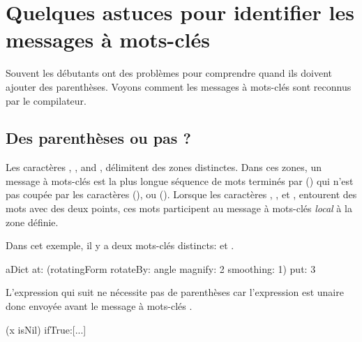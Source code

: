 \documentclass[a4paper,10pt,twoside]{book}
\begin{document}
\section{Quelques astuces pour identifier les messages à mots-clés}
Souvent les débutants ont des problèmes pour comprendre quand ils doivent ajouter des parenthèses. Voyons comment les messages à mots-clés sont reconnus par le compilateur.

\subsection{Des parenthèses ou pas ?}
Les caractères \ct{[}, \ct{]}, and \ct{(}, \ct{)} 
délimitent des zones distinctes. Dans ces zones, un message à mots-clés est la plus longue séquence de mots terminés par (\ct{:}) qui n'est pas coupée par les caractères (), ou (\ct{;}). 
Lorsque les caractères \ct{[}, \ct{]}, et \ct{(}, \ct{)} entourent des mots avec des deux points, ces mots participent au message à mots-clés \emph{local} à la zone définie.

Dans cet exemple, il y a deux mots-clés distincts:  et .

\begin{code}{}
aDict
   at: (rotatingForm 
          rotateBy: angle	
          magnify: 2 
          smoothing: 1)
   put: 3
\end{code}




L'expression qui suit ne nécessite pas de parenthèses car l'expression  est unaire donc envoyée avant le message à mots-clés \mbox{.}
\begin{code}{}
(x isNil)
   ifTrue:[...]
\end{code}
\end{document}
